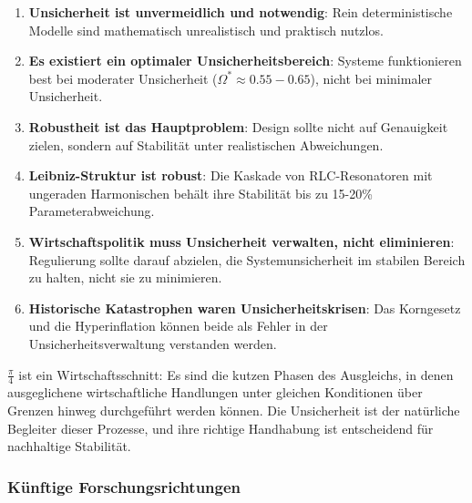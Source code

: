 \documentclass[a4paper,12pt,twoside]{report}
\theoremstyle{definition}
\begin{document}
\begin{enumerate}
    \item \textbf{Unsicherheit ist unvermeidlich und notwendig}: Rein deterministische Modelle sind mathematisch unrealistisch und praktisch nutzlos.
    
    \item \textbf{Es existiert ein optimaler Unsicherheitsbereich}: Systeme funktionieren best bei moderater Unsicherheit ($\Omega^* \approx 0.55-0.65$), nicht bei minimaler Unsicherheit.
    
    \item \textbf{Robustheit ist das Hauptproblem}: Design sollte nicht auf Genauigkeit zielen, sondern auf Stabilität unter realistischen Abweichungen.
    
    \item \textbf{Leibniz-Struktur ist robust}: Die Kaskade von RLC-Resonatoren mit ungeraden Harmonischen behält ihre Stabilität bis zu 15-20\% Parameterabweichung.
    
    \item \textbf{Wirtschaftspolitik muss Unsicherheit verwalten, nicht eliminieren}: Regulierung sollte darauf abzielen, die Systemunsicherheit im stabilen Bereich zu halten, nicht sie zu minimieren.
    
    \item \textbf{Historische Katastrophen waren Unsicherheitskrisen}: Das Korngesetz und die Hyperinflation können beide als Fehler in der Unsicherheitsverwaltung verstanden werden.
\end{enumerate}

$\frac{\pi}{4}$ ist ein Wirtschaftsschnitt: Es sind die kutzen Phasen des Ausgleichs, in denen ausgeglichene wirtschaftliche Handlungen unter gleichen Konditionen über Grenzen hinweg durchgeführt werden können. Die Unsicherheit ist der natürliche Begleiter dieser Prozesse, und ihre richtige Handhabung ist entscheidend für nachhaltige Stabilität.

\subsubsection{Künftige Forschungsrichtungen}
\end{document}

